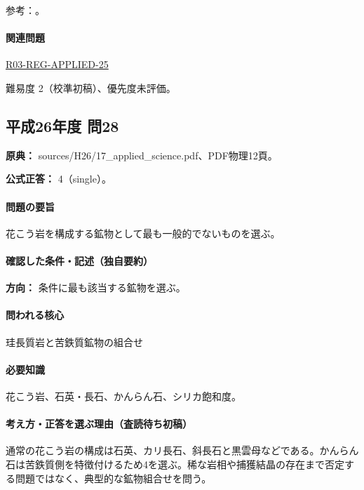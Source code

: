 \par 参考：\cite{hom_biotite,hom_quartz,hom_orthoclase,nelson_inosilicates}。

\paragraph{関連問題} \hyperref[q:r03-reg-applied-25]{R03-REG-APPLIED-25}

\par 難易度 2（校準初稿）、優先度未評価。

\subsection{平成26年度 問28}
\label{q:h26-reg-applied-28}

\noindent\textbf{原典：} sources/H26/17\_applied\_science.pdf、PDF物理12頁。

\textbf{公式正答：} 4（single）。

\paragraph{問題の要旨} 花こう岩を構成する鉱物として最も一般的でないものを選ぶ。

\paragraph{確認した条件・記述（独自要約）}\mbox{}\par

\noindent\textbf{方向：} 条件に最も該当する鉱物を選ぶ。\par

\paragraph{問われる核心} 珪長質岩と苦鉄質鉱物の組合せ

\paragraph{必要知識} 花こう岩、石英・長石、かんらん石、シリカ飽和度。

\paragraph{考え方・正答を選ぶ理由（査読待ち初稿）} 通常の花こう岩の構成は石英、カリ長石、斜長石と黒雲母などである。かんらん石は苦鉄質側を特徴付けるため4を選ぶ。稀な岩相や捕獲結晶の存在まで否定する問題ではなく、典型的な鉱物組合せを問う。

